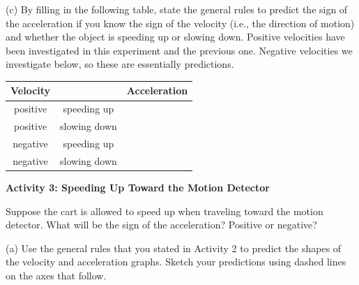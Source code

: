 (c) By filling in the following table, state the general rules to predict the 
sign of the acceleration if you know the sign of the velocity (i.e., the 
direction of motion) and whether the object is speeding up or slowing down. 
Positive velocities have been investigated in this experiment and the previous 
one. Negative velocities we investigate below, so these are essentially 
predictions.

\vspace{0.3cm}
{\centering \begin{tabular}{|c|c|c|}
\hline
Velocity&
&
Acceleration\\
\hline
positive&
speeding up&
\\
\hline
positive&
slowing down&
\\
\hline
negative&
speeding up&
\\
\hline
negative&
slowing down&
\\
\hline
\end{tabular}\par}
\vspace{0.3cm}


\pagebreak[2]
\textbf{Activity 3: Speeding Up Toward the Motion Detector} 

Suppose the cart is allowed to speed up when traveling toward the motion 
detector. What will be the sign of the acceleration? Positive or negative? 

(a) Use the general rules that you stated in Activity 2 to predict the shapes
of the velocity and acceleration graphs. Sketch your predictions using dashed
lines on the axes that follow.

